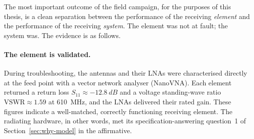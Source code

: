 The most important outcome of the field campaign, for the purposes of this
thesis, is a clean separation between the performance of the receiving
\emph{element} and the performance of the receiving \emph{system}. The element
was not at fault; the system was. The evidence is as follows.

\paragraph{The element is validated.} During troubleshooting, the antennas and their
LNAs were characterised directly at the feed point with a vector network
analyser (NanoVNA). Each element returned a return loss
$S_{11}\approx\SI{-12.8}{dB}$ and a voltage standing-wave ratio
$\mathrm{VSWR}\approx1.59$ at \SI{610}{\mega\hertz}, and the LNAs delivered their
rated gain. These figures indicate a well-matched, correctly functioning
receiving element. The radiating hardware, in other words, met its specification-answering
question~1 of Section~\ref{sec:why-model} in the affirmative.

